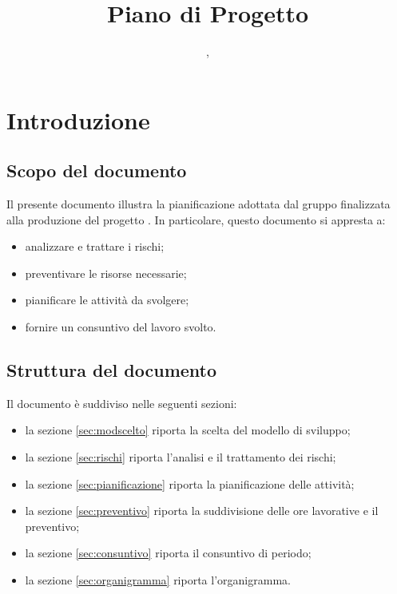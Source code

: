 

\author{\GG, \LS}
\supervisor{\LB}
\dest{\TV, \ZU}
\title{Piano di Progetto}


\maketitle

\tableofcontents
\listoffigures






\section{Introduzione}

\subsection{Scopo del documento}
Il presente documento illustra la pianificazione adottata dal gruppo \hx{} finalizzata alla produzione del progetto \proj.
In particolare, questo documento si appresta a:
\begin{itemize}
	\item analizzare e trattare i rischi;
	\item preventivare le risorse necessarie;
	\item pianificare le attività da svolgere;
	\item fornire un consuntivo del lavoro svolto.
\end{itemize}

\subsection{Struttura del documento}
Il documento è suddiviso nelle seguenti sezioni:
\begin{itemize}
	\item la sezione \ref{sec:modscelto} riporta la scelta del modello di sviluppo;
	\item la sezione \ref{sec:rischi} riporta l'analisi e il trattamento dei rischi;
	\item la sezione \ref{sec:pianificazione} riporta la pianificazione delle attività;
	\item la sezione \ref{sec:preventivo} riporta la suddivisione delle ore lavorative e il preventivo;
	\item la sezione \ref{sec:consuntivo} riporta il consuntivo di periodo;
	\item la sezione \ref{sec:organigramma} riporta l'organigramma.
\end{itemize}

